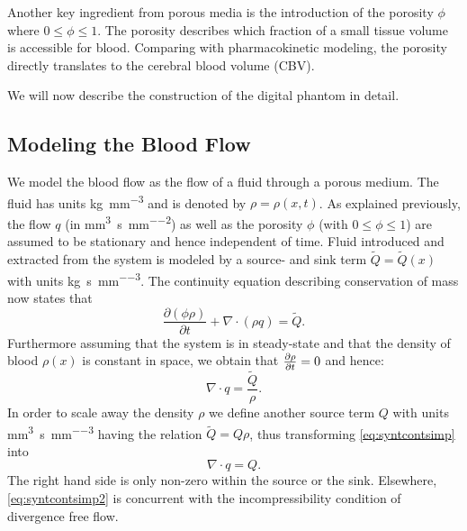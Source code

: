 \documentclass[paper=a4, fontsize=12pt,parskip=half,draft,headings=small]{scrartcl}
\begin{document}
	Another key ingredient from porous media is the introduction of the porosity $\phi$ where $0 \le \phi \le 1$.
	The porosity describes which fraction of a small tissue volume is accessible for blood.
	Comparing with pharmacokinetic modeling, the porosity directly translates to the cerebral blood volume (CBV).

	We will now describe the construction of the digital phantom in detail.
	
	
	\subsection{Modeling the Blood Flow}\label{sec:flow}
	
	We model the blood flow as the flow of a fluid through a porous medium. 
	The fluid has units \si{\kilo\gram\per\cubic\milli\meter} and is denoted by $\rho = \rho(x,t)$.
	As explained previously, the flow $q$ (in \si{\cubic\milli\meter\per\second\per\square\milli\meter}) as well as the porosity $\phi$ (with $0 \le \phi \le 1$) are assumed to be stationary and hence independent of time.
	Fluid introduced and extracted from the system is modeled by a source- and sink term $\tilde{Q} = \tilde{Q}(x)$ with units \si{\kilo\gram\per\second\per\cubic\milli\meter}. 
	The continuity equation describing conservation of mass now states that
	\begin{equation}
		\frac{\partial (\phi \rho)}{\partial t} + \nabla \cdot (\rho q) = \tilde{Q}.
		\label{eq:syntcont}
	\end{equation} 
	Furthermore assuming that the system is in steady-state and that the density of blood $\rho(x)$ is constant in space, we obtain that $\frac{\partial \rho}{\partial t} = 0$ and hence:
	\begin{equation}
		\nabla \cdot q = \frac{\tilde{Q}}{\rho}.
		\label{eq:syntcontsimp}
	\end{equation}
	In order to scale away the density $\rho$ we define another source term $Q$ with units \si{\cubic\milli\meter\per\second\per\cubic\milli\meter} having the relation $\tilde{Q} = Q\rho$, thus transforming \eqref{eq:syntcontsimp} into
	\begin{equation}
		\nabla \cdot q = Q.
		\label{eq:syntcontsimp2}
	\end{equation}
	The right hand side is only non-zero within the source or the sink. 
	Elsewhere, \eqref{eq:syntcontsimp2} is concurrent with the incompressibility condition of divergence free flow.
	
\end{document}
